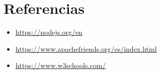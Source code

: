 \documentclass{article}
\begin{document}
	
  \newpage
  \section{Referencias}
  \begin{itemize}
    \item \url{https://nodejs.org/en}
    \item \url{https://www.apachefriends.org/es/index.html}
    \item \url{https://www.w3schools.com/}
  \end{itemize}

%
%
%
			
\end{document}
